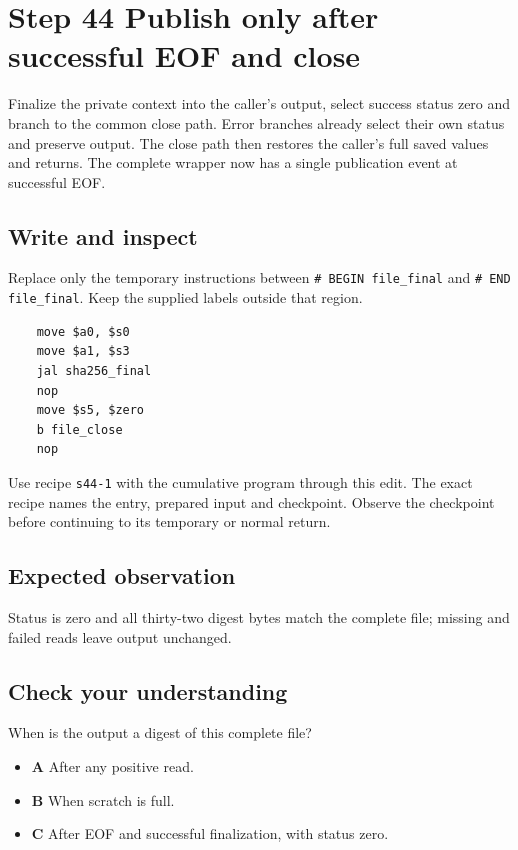 \section{Step 44 Publish only after successful EOF and close}\label{sha-s44}

Finalize the private context into the caller's output, select success status zero and branch to the common close path. Error branches already select their own status and preserve output. The close path then restores the caller's full saved values and returns. The complete wrapper now has a single publication event at successful EOF.

\subsection{Write and inspect}
Replace only the temporary instructions between \texttt{\# BEGIN file\_final} and \texttt{\# END file\_final}. Keep the supplied labels outside that region.

\begin{verbatim}
    move $a0, $s0
    move $a1, $s3
    jal sha256_final
    nop
    move $s5, $zero
    b file_close
    nop
\end{verbatim}

Use recipe \texttt{s44-1} with the cumulative program through this edit. The exact recipe names the entry, prepared input and checkpoint. Observe the checkpoint before continuing to its temporary or normal return.

\subsection{Expected observation}
Status is zero and all thirty-two digest bytes match the complete file; missing and failed reads leave output unchanged.

\subsection{Check your understanding}
When is the output a digest of this complete file?

\begin{itemize}
  \item \textbf{A} After any positive read.
  \item \textbf{B} When scratch is full.
  \item \textbf{C} After EOF and successful finalization, with status zero.
\end{itemize}

